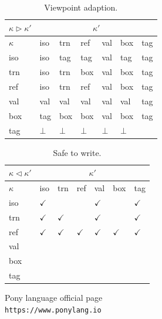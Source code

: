 \documentclass{article}
\begin{document}
\begin{multicols}{2}
\begin{table}[]
\centering
\begin{tabular}{lllllll}
\hline
$\kappa \triangleright \kappa'$ & \multicolumn{6}{c}{$\kappa'$}             \\ \hline
$\kappa$                 & iso & trn & ref & val & box & tag \\ \hline \hline
iso               & iso & tag & tag & val & tag & tag \\ \hline
trn               & iso & trn & box & val & box & tag \\ \hline
ref               & iso & trn & ref & val & box & tag \\ \hline
val               & val & val & val & val & val & tag \\ \hline
box               & tag & box & box & val & box & tag \\ \hline
tag               &  $\bot$ & $\bot$ & $\bot$ & $\bot$ & $\bot$ &     \\ \hline
\end{tabular}
\caption{Viewpoint adaption.\cite{type-proof-paper}}
\end{table}


\begin{table}[]
\centering
\begin{tabular}{lllllll}
\hline
$\kappa \triangleleft \kappa'$ & \multicolumn{6}{c}{$\kappa'$}             \\ \hline
$\kappa$                 & iso & trn & ref & val & box & tag \\ \hline \hline
iso               & $\checkmark$ &  &  & $\checkmark$ &  & $\checkmark$ \\ \hline
trn               & $\checkmark$ & $\checkmark$ &  & $\checkmark$ &  & $\checkmark$ \\ \hline
ref               & $\checkmark$ & $\checkmark$ & $\checkmark$ & $\checkmark$ & $\checkmark$ & $\checkmark$ \\ \hline
val               &  &  &  &  &  &  \\ \hline
box               &  &  &  &  &  &  \\ \hline
tag               &   &  &  &  &  &     \\ \hline
\end{tabular}
\caption{Safe to write.\cite{type-proof-paper}}
\end{table}




\begin{thebibliography}{9}
Pony language official page
\\\texttt{https://www.ponylang.io}


\end{thebibliography}
\end{multicols}
\end{document}
